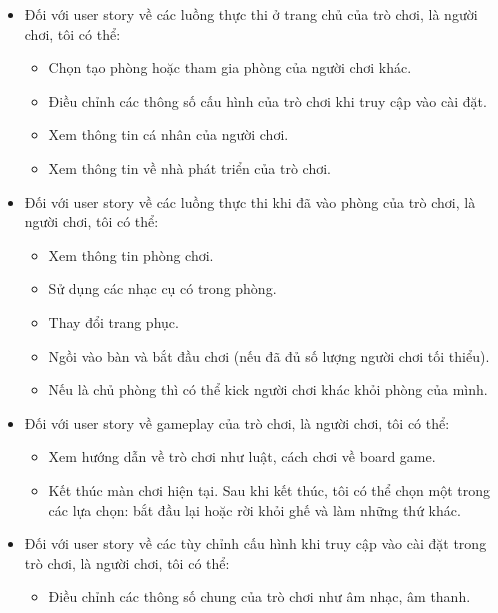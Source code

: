 \begin{itemize}
    \item  Đối với user story về các luồng thực thi ở trang chủ của trò chơi, là người chơi, tôi có thể:
        \begin{itemize}
            \item Chọn tạo phòng hoặc tham gia phòng của người chơi khác.
            \item Điều chỉnh các thông số cấu hình của trò chơi khi truy cập vào cài đặt.
            \item Xem thông tin cá nhân của người chơi.
            \item Xem thông tin về nhà phát triển của trò chơi.
        \end{itemize}
    \item Đối với user story về các luồng thực thi khi đã vào phòng của trò chơi, là người chơi, tôi có thể:
        \begin{itemize}
            \item Xem thông tin phòng chơi.
            \item Sử dụng các nhạc cụ có trong phòng.
            \item Thay đổi trang phục.
            \item Ngồi vào bàn và bắt đầu chơi (nếu đã đủ số lượng người chơi tối thiểu).
            \item Nếu là chủ phòng thì có thể kick người chơi khác khỏi phòng của mình.
        \end{itemize}
    \item Đối với user story về gameplay của trò chơi, là người chơi, tôi có thể:
        \begin{itemize}
            \item Xem hướng dẫn về trò chơi như luật, cách chơi về board game.
            \item Kết thúc màn chơi hiện tại. Sau khi kết thúc, tôi có thể chọn một trong các lựa chọn: bắt đầu lại hoặc rời khỏi ghế và làm những thứ khác.
        \end{itemize}
    \item Đối với user story về các tùy chỉnh cấu hình khi truy cập vào cài đặt trong trò chơi, là người chơi, tôi có thể:
        \begin{itemize}
            \item Điều chỉnh các thông số chung của trò chơi như âm nhạc, âm thanh.
        \end{itemize}
\end{itemize}